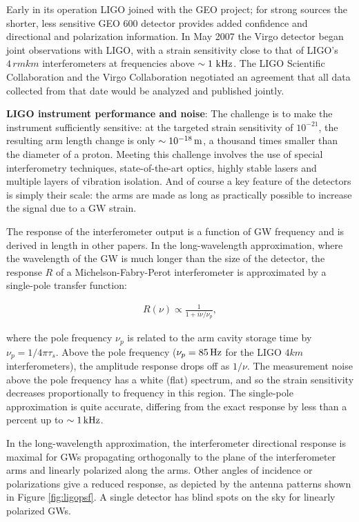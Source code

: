 \documentclass[a4paper,10pt]{article}
\begin{document}
{\noindent}Early in its operation LIGO joined with the GEO project; for strong sources the shorter, less sensitive GEO 600 detector provides added confidence and directional and polarization information. In May 2007 the Virgo detector began joint observations with LIGO, with a strain sensitivity close to that of LIGO's $4\,{rm km}$ interferometers at frequencies above $\sim1\,{\rm\,kHz}$. The LIGO Scientific Collaboration and the Virgo Collaboration negotiated an agreement that all data collected from that date would be analyzed and published jointly.

{\noindent}\textbf{LIGO instrument performance and noise}: The challenge is to make the instrument sufficiently sensitive: at the targeted strain sensitivity of $10^{-21}$, the resulting arm length change is only $\sim10^{-18}\,{\rm m}$, a thousand times smaller than the diameter of a proton. Meeting this challenge involves the use of special interferometry techniques, state-of-the-art optics, highly stable lasers and multiple layers of vibration isolation. And of course a key feature of the detectors is simply their scale: the arms are made as long as practically possible to increase the signal due to a GW strain.

{\noindent}The response of the interferometer output is a function of GW frequency and is derived in length in other papers. In the long-wavelength approximation, where the wavelength of the GW is much longer than the size of the detector, the response $R$ of a Michelson-Fabry-Perot interferometer is approximated by a single-pole transfer function:

\begin{align*}
    R(\nu) \propto \frac{1}{1+i\nu/\nu_p},
\end{align*}

{\noindent}where the pole frequency $\nu_p$ is related to the arm cavity storage time by $\nu_p=1/4\pi\tau_s$. Above the pole frequency ($\nu_p=85\,{\rm Hz}$ for the LIGO $4 km$ interferometers), the amplitude response drops off as $1/\nu$. The measurement noise above the pole frequency has a white (flat) spectrum, and so the strain sensitivity decreases proportionally to frequency in this region. The single-pole approximation is quite accurate, differing from the exact response by less than a percent up to $\sim1\,{\rm kHz}$.

{\noindent}In the long-wavelength approximation, the interferometer directional response is maximal for GWs propagating orthogonally to the plane of the interferometer arms and linearly polarized along the arms. Other angles of incidence or polarizations give a reduced response, as depicted by the antenna patterns shown in Figure \ref{fig:ligopsf}. A single detector has blind spots on the sky for linearly polarized GWs.
\end{document}
